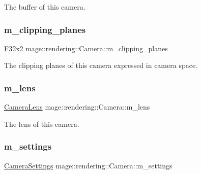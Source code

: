 The buffer of this camera. \hypertarget{classmage_1_1rendering_1_1_camera_a0224d8321b9a45251ff12f5771a1e5fc}{}\label{classmage_1_1rendering_1_1_camera_a0224d8321b9a45251ff12f5771a1e5fc} 
\subsubsection{\texorpdfstring{m\+\_\+clipping\+\_\+planes}{m\_clipping\_planes}}
{\footnotesize\ttfamily \hyperlink{namespacemage_aa87237ad091f5cd7da612b8523fc108f}{F32x2} mage\+::rendering\+::\+Camera\+::m\+\_\+clipping\+\_\+planes\hspace{0.3cm}{\ttfamily [private]}}

The clipping planes of this camera expressed in camera space. \hypertarget{classmage_1_1rendering_1_1_camera_a0716fc9d2b3c8f41da75205caa428189}{}\label{classmage_1_1rendering_1_1_camera_a0716fc9d2b3c8f41da75205caa428189} 
\subsubsection{\texorpdfstring{m\+\_\+lens}{m\_lens}}
{\footnotesize\ttfamily \hyperlink{classmage_1_1rendering_1_1_camera_lens}{Camera\+Lens} mage\+::rendering\+::\+Camera\+::m\+\_\+lens\hspace{0.3cm}{\ttfamily [private]}}

The lens of this camera. \hypertarget{classmage_1_1rendering_1_1_camera_a9a8cfd88c1a3b2b54779bbe0f34d30d2}{}\label{classmage_1_1rendering_1_1_camera_a9a8cfd88c1a3b2b54779bbe0f34d30d2} 
\subsubsection{\texorpdfstring{m\+\_\+settings}{m\_settings}}
{\footnotesize\ttfamily \hyperlink{classmage_1_1rendering_1_1_camera_settings}{Camera\+Settings} mage\+::rendering\+::\+Camera\+::m\+\_\+settings\hspace{0.3cm}{\ttfamily [private]}}

